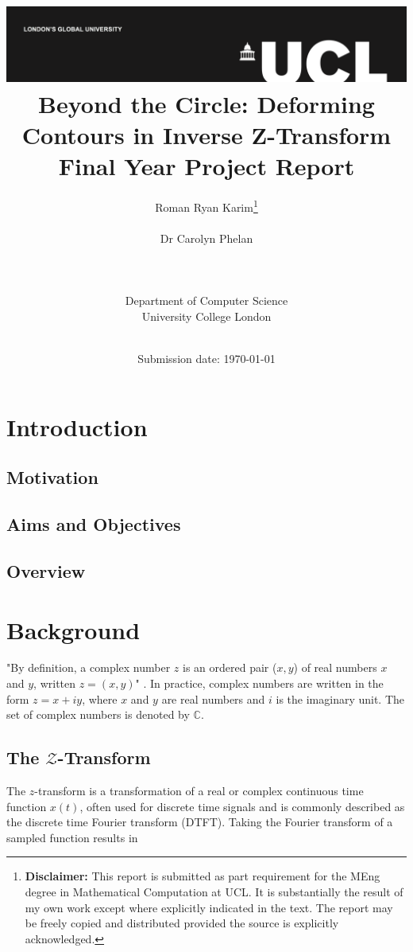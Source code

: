 \documentclass[a4paper]{report}
\title{{\vspace{-14em} \includegraphics[scale=0.4]{Logos/ucl_logo.png}}\\
{{\vspace{2em} \Huge Beyond the Circle: Deforming Contours in Inverse Z-Transform}}\\
{\large Final Year Project Report}\\
}
\date{Submission date: \today}
\author{Roman Ryan Karim\thanks{
{\bf Disclaimer:}
This report is submitted as part requirement for the MEng degree in Mathematical Computation at UCL. It is substantially the result of my own work except where explicitly indicated in the text. The report may be freely copied and distributed provided the source is explicitly acknowledged.}
\\ \\ Dr Carolyn Phelan
\\ \\ \\ \\ Department of Computer Science
\\ University College London
\\ \\
}
\begin{document}
 
\onehalfspacing
\maketitle
\begin{abstract}

\end{abstract}

\tableofcontents
\setcounter{page}{1}

\chapter{Introduction}
\section{Motivation}

\section{Aims and Objectives}

\section{Overview}

\chapter{Background}
"By definition, a complex number $z$ is an ordered pair ($x, y$) of real numbers $x$ and $y$, written $z = (x, y)$" \cite{kreyszig2010advanced}. In practice, complex numbers are written in the form $z = x + iy$, where $x$ and $y$ are real numbers and $i$ is the imaginary unit. The set of complex numbers is denoted by $\mathbb{C}$.


\section{The \texorpdfstring{$\mathcal{Z}$}{Lg}-Transform}

The $z$-transform is a transformation of a real or complex continuous time function $x(t)$, often used for discrete time signals and is commonly described as the discrete time Fourier transform (DTFT). Taking the Fourier transform of a sampled function results in
\end{document}
